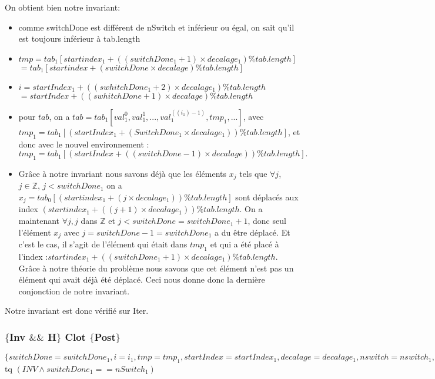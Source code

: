 On obtient bien notre invariant:
\begin{itemize}
	\item comme switchDone est différent de nSwitch et inférieur ou égal, on sait qu'il est toujours inférieur à tab.length
	\item $tmp = tab_{1}[startindex_{1} + ((switchDone_{1}+1)\times decalage_{1}) \% tab.length]$ 
		\subitem $= tab_{1}[startindex + (switchDone\times decalage) \% tab.length]$
	\item $i = startIndex_{1} + ((swhitchDone_{1}+2)\times decalage_{1}) \% tab.length $
		\subitem $= startIndex + ((swhitchDone+1)\times decalage) \%tab.length$
	\item pour $tab$, on a $tab = tab_{1}[val_{1}^{0},val_{1}^{1}, ..., val_{1}^{((i_{1})-1)}, tmp_{1}, ...]$, avec $tmp_{1} = tab_{1}[(startIndex_{1} + (SwitchDone_{1}\times decalage_{1})) \% tab.length]$, et donc avec le nouvel environnement : $tmp_{1} = tab_{1}[(startIndex + ((switchDone-1)\times decalage)) \% tab.length].$ 
	\item Grâce à notre invariant nous savons déjà que les éléments $x_{j}$ tels que $\forall j$, $j \in \mathbb{Z}$, $j<switchDone_{1}$ on a $x_{j}=tab_{0}[(startindex_{1} + (j\times decalage_{1})) \% tab.length]$ sont déplacés aux index $(startindex_{1} + ((j+1)\times decalage_{1}))\% tab.length$. On a maintenant $\forall j, j$ dans $\mathbb{Z}$ et $j<switchDone=switchDone_{1} + 1$, donc seul l'élément $x_{j}$ avec $j= switchDone - 1 = switchDone_{1}$ a du être déplacé. Et c'est le cas, il s'agit de l'élément qui était dans $tmp_{1}$ et qui a été placé à l'index :$ startindex_{1} + ((switchDone_{1}+1)\times decalage_{1}) \% tab.length$. Grâce à notre théorie du problème nous savons que cet élément n'est pas un élément qui avait déjà été déplacé. Ceci nous donne donc la dernière conjonction de notre invariant. \\
\end{itemize}

Notre invariant est donc vérifié sur Iter. \\

\subsubsection*{$\{$Inv $\&\&$ H$\}$ Clot $\{$Post$\}$}

$\{switchDone = switchDone_{1}, i = i_{1}, tmp = tmp_{1}, startIndex = startIndex_{1}, decalage = decalage_{1}, nswitch = nswitch_{1}, tab = tab_{1}\}$\\ 
tq $(INV \wedge switchDone_{1} == nSwitch_{1})$ \\

